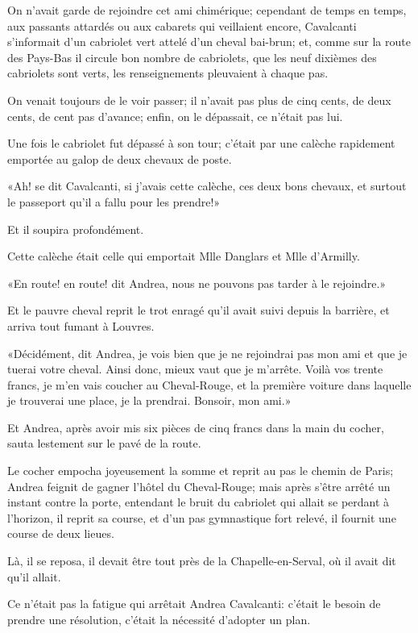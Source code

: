 On n'avait garde de rejoindre cet ami chimérique; cependant de temps en temps, aux passants attardés ou aux cabarets qui veillaient encore, Cavalcanti s'informait d'un cabriolet vert attelé d'un cheval bai-brun; et, comme sur la route des Pays-Bas il circule bon nombre de cabriolets, que les neuf dixièmes des cabriolets sont verts, les renseignements pleuvaient à chaque pas. 

On venait toujours de le voir passer; il n'avait pas plus de cinq cents, de deux cents, de cent pas d'avance; enfin, on le dépassait, ce n'était pas lui. 

Une fois le cabriolet fut dépassé à son tour; c'était par une calèche rapidement emportée au galop de deux chevaux de poste. 

«Ah! se dit Cavalcanti, si j'avais cette calèche, ces deux bons chevaux, et surtout le passeport qu'il a fallu pour les prendre!» 

Et il soupira profondément. 

Cette calèche était celle qui emportait Mlle Danglars et Mlle d'Armilly. 

«En route! en route! dit Andrea, nous ne pouvons pas tarder à le rejoindre.» 

Et le pauvre cheval reprit le trot enragé qu'il avait suivi depuis la barrière, et arriva tout fumant à Louvres. 

«Décidément, dit Andrea, je vois bien que je ne rejoindrai pas mon ami et que je tuerai votre cheval. Ainsi donc, mieux vaut que je m'arrête. Voilà vos trente francs, je m'en vais coucher au Cheval-Rouge, et la première voiture dans laquelle je trouverai une place, je la prendrai. Bonsoir, mon ami.» 

Et Andrea, après avoir mis six pièces de cinq francs dans la main du cocher, sauta lestement sur le pavé de la route. 

Le cocher empocha joyeusement la somme et reprit au pas le chemin de Paris; Andrea feignit de gagner l'hôtel du Cheval-Rouge; mais après s'être arrêté un instant contre la porte, entendant le bruit du cabriolet qui allait se perdant à l'horizon, il reprit sa course, et d'un pas gymnastique fort relevé, il fournit une course de deux lieues. 

Là, il se reposa, il devait être tout près de la Chapelle-en-Serval, où il avait dit qu'il allait. 

Ce n'était pas la fatigue qui arrêtait Andrea Cavalcanti: c'était le besoin de prendre une résolution, c'était la nécessité d'adopter un plan. 

